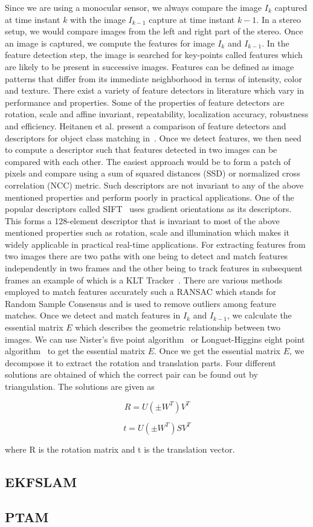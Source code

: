 Since we are using a monocular sensor, we always compare the image $I_k$ captured at time instant $k$ with the image $I_{k-1}$ capture at time instant $k-1$. In a stereo setup, we would compare images from the left and right part of the stereo. Once an image is captured, we compute the features for image $I_k$ and $I_{k-1}$. In the feature detection step, the image is searched for key-points called features  which are likely to be present in successive images. Features can be defined as image patterns that differ from its immediate neighborhood in terms of intensity, color and texture. There exist a variety of feature detectors in literature which vary in performance and properties. Some of the properties of feature detectors are rotation, scale and affine invariant, repeatability, localization accuracy, robustness and efficiency.  Heitanen et al. present a comparison of feature detectors and descriptors for object class matching in~\cite{hietanen2016comparison}. Once we detect features, we then need to compute a descriptor such that features detected in two images can be compared with each other. The easiest approach would be to form a patch of pixels and compare using a sum of squared distances (SSD) or normalized cross correlation (NCC) metric. Such descriptors are not invariant to any of the above mentioned properties and perform poorly in practical applications. One of the popular descriptors called SIFT~\cite{lowe2004distinctive} uses gradient orientations as its descriptors. This forms a 128-element descriptor that is invariant to most of the above mentioned properties such as rotation, scale and illumination which makes it widely applicable in practical real-time applications. For extracting features from two images there are two paths with one being to detect and match features independently in two frames and the other being to track features in subsequent frames an example of which is a KLT Tracker~\cite{tomasi1991detection}. There are various methods employed to match features accurately such a RANSAC which stands for Random Sample Consensus and is used to remove outliers among feature matches. Once we detect and match features in $I_k$ and $I_{k-1}$, we calculate the essential matrix $E$ which describes the geometric relationship between two images. We can use Nister’s five point algorithm~\cite{nister2004efficient} or Longuet-Higgins eight point algorithm~\cite{longuet1981computer} to get the essential matrix $E$. Once we get the essential matrix $E$, we decompose it to extract the rotation and translation parts. Four different solutions are obtained of which the correct pair can be found out by triangulation. The solutions are given as

\begin{equation}
	R = U(\pm W^T)V^T
\end{equation}

\begin{equation}	
	t = U(\pm W^T)SV^T
\end{equation}

where R is the rotation matrix and t is the translation vector. 

\subsection{EKFSLAM}

\subsection{PTAM}
